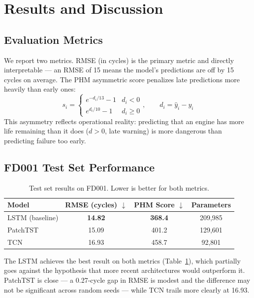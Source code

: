 \documentclass{article}
\begin{document}
\section{Results and Discussion}

\subsection*{Evaluation Metrics}

We report two metrics. RMSE (in cycles) is the primary metric and directly interpretable — an RMSE of 15 means the model's predictions are off by 15 cycles on average. The PHM asymmetric score \citep{saxena2008damage} penalizes late predictions more heavily than early ones:
\[
s_i = \begin{cases} e^{-d_i/13} - 1 & d_i < 0 \\ e^{d_i/10} - 1 & d_i \geq 0 \end{cases}, \qquad d_i = \hat{y}_i - y_i
\]
This asymmetry reflects operational reality: predicting that an engine has more life remaining than it does ($d > 0$, late warning) is more dangerous than predicting failure too early.

\subsection*{FD001 Test Set Performance}

\begin{table}[h]
\caption{Test set results on FD001. Lower is better for both metrics.}
\label{tab:fd001}
\centering
\begin{tabular}{lccc}
\toprule
Model & RMSE (cycles) $\downarrow$ & PHM Score $\downarrow$ & Parameters \\
\midrule
LSTM (baseline) & \textbf{14.82} & \textbf{368.4} & 209,985 \\
PatchTST        & 15.09          & 401.2          & 129,601 \\
TCN             & 16.93          & 458.7          & 92,801  \\
\bottomrule
\end{tabular}
\end{table}

The LSTM achieves the best result on both metrics (Table~\ref{tab:fd001}), which partially goes against the hypothesis that more recent architectures would outperform it. PatchTST is close — a 0.27-cycle gap in RMSE is modest and the difference may not be significant across random seeds — while TCN trails more clearly at 16.93.
\end{document}
